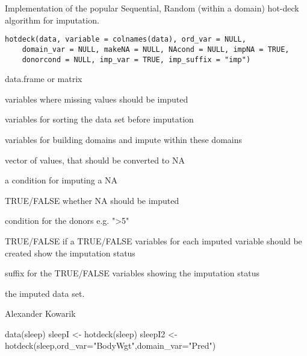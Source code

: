%
\begin{Description}\relax
Implementation of the popular Sequential, Random (within a domain) hot-deck algorithm for imputation.
\end{Description}
%
\begin{Usage}
\begin{verbatim}
hotdeck(data, variable = colnames(data), ord_var = NULL,
    domain_var = NULL, makeNA = NULL, NAcond = NULL, impNA = TRUE,
    donorcond = NULL, imp_var = TRUE, imp_suffix = "imp")
\end{verbatim}
\end{Usage}
%
\begin{Arguments}
\begin{ldescription}
\item[\code{data}] 
data.frame or matrix

\item[\code{variable}] 
variables where missing values should be imputed

\item[\code{ord\_var}] 
variables for sorting the data set before imputation

\item[\code{domain\_var}] 
variables for building domains and impute within these domains

\item[\code{makeNA}] 
vector of values, that should be converted to NA

\item[\code{NAcond}] 
a condition for imputing a NA

\item[\code{impNA}] 
TRUE/FALSE whether NA should be imputed

\item[\code{donorcond}] 
condition for the donors e.g. ">5"

\item[\code{imp\_var}] 
TRUE/FALSE if a TRUE/FALSE variables for each imputed variable should be created show the imputation status

\item[\code{imp\_suffix}] 
suffix for the TRUE/FALSE variables showing the imputation status

\end{ldescription}
\end{Arguments}
%
\begin{Value}
the imputed data set.
\end{Value}
%
\begin{Author}\relax
Alexander Kowarik
\end{Author}
%
\begin{Examples}
\begin{ExampleCode}
data(sleep)
sleepI <- hotdeck(sleep)
sleepI2 <- hotdeck(sleep,ord_var="BodyWgt",domain_var="Pred")
\end{ExampleCode}
\end{Examples}
